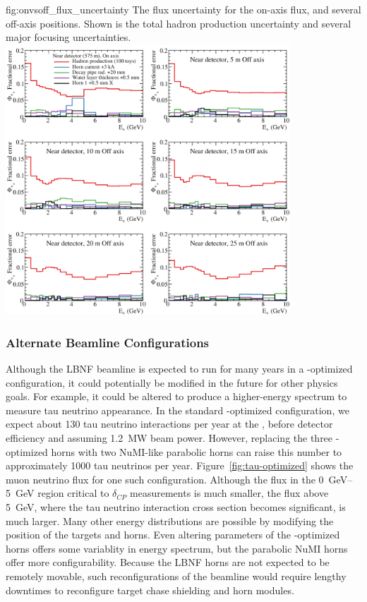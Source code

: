 \begin{dunefigure}{fig:onvsoff_flux_uncertainty}
{The flux uncertainty for the on-axis flux, and several off-axis positions. Shown is the total hadron production uncertainty and several major focusing uncertainties.}
    \includegraphics[width=0.8\textwidth]{graphics/onaxis_vs_offaxis_uncertainties.png}
\end{dunefigure}

\subsubsection{Alternate Beamline Configurations}

Although the LBNF beamline is expected to run for many years in a -optimized configuration, it could potentially be modified in the future for other physics goals.  For example, it could be altered to produce a higher-energy spectrum %
to measure tau neutrino appearance.  In the standard -optimized configuration, we expect about 130 tau neutrino  interactions per year %
at the , before detector efficiency and assuming \SI{1.2}{MW} beam power.  However, replacing the three -optimized horns with two NuMI-like parabolic horns can raise this number to approximately \num{1000} tau neutrinos per year.  Figure~\ref{fig:tau-optimized} shows the muon neutrino flux for one such configuration.  Although the flux in the \SIrange{0}{5}{\GeV} region critical to $\delta_{CP}$ measurements is much smaller, the flux above \SI{5}{\GeV}, where the tau neutrino interaction cross section becomes significant, is much larger.  Many other energy distributions are possible by modifying the position of the targets and horns.  Even altering parameters of the -optimized horns offers some variablity in energy spectrum, but the parabolic NuMI horns offer more configurability.  Because the LBNF horns are not expected to be remotely movable, such reconfigurations of the beamline would require lengthy downtimes to reconfigure target chase shielding and horn modules.   

